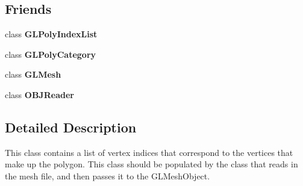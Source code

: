 \subsection*{Friends}
\begin{DoxyCompactItemize}
\item 
\hypertarget{classCartWheel_1_1GL_1_1GLIndexedPoly_a69902e7bf669f5d8980e688fb8baccaa}{
class {\bfseries GLPolyIndexList}}
\label{classCartWheel_1_1GL_1_1GLIndexedPoly_a69902e7bf669f5d8980e688fb8baccaa}

\item 
\hypertarget{classCartWheel_1_1GL_1_1GLIndexedPoly_ae74f0661e50601fed5e420fd78bb98b9}{
class {\bfseries GLPolyCategory}}
\label{classCartWheel_1_1GL_1_1GLIndexedPoly_ae74f0661e50601fed5e420fd78bb98b9}

\item 
\hypertarget{classCartWheel_1_1GL_1_1GLIndexedPoly_a7ad5c94227dd02947e02998b7eaaf5d9}{
class {\bfseries GLMesh}}
\label{classCartWheel_1_1GL_1_1GLIndexedPoly_a7ad5c94227dd02947e02998b7eaaf5d9}

\item 
\hypertarget{classCartWheel_1_1GL_1_1GLIndexedPoly_af14de259cd9a2f23c83f88f5a00f3865}{
class {\bfseries OBJReader}}
\label{classCartWheel_1_1GL_1_1GLIndexedPoly_af14de259cd9a2f23c83f88f5a00f3865}

\end{DoxyCompactItemize}


\subsection{Detailed Description}
This class contains a list of vertex indices that correspond to the vertices that make up the polygon. This class should be populated by the class that reads in the mesh file, and then passes it to the GLMeshObject. 

